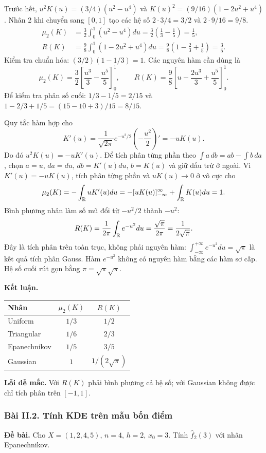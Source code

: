 Trước hết,
$u^2K(u)=(3/4)(u^2-u^4)$ và
$K(u)^2=(9/16)(1-2u^2+u^4)$.
Nhân 2 khi chuyển sang $[0,1]$ tạo các hệ số
$2\cdot3/4=3/2$ và $2\cdot9/16=9/8$.
\begin{align*}
\mu_2(K)&=\frac32\int_0^1(u^2-u^4)du
=\frac32\left(\frac13-\frac15\right)=\frac15,\\
R(K)&=\frac98\int_0^1(1-2u^2+u^4)du
=\frac98\left(1-\frac23+\frac15\right)=\frac35.
\end{align*}
Kiểm tra chuẩn hóa: $(3/2)(1-1/3)=1$.
Các nguyên hàm cần dùng là
\[
\mu_2(K)=\frac32\left[\frac{u^3}{3}-\frac{u^5}{5}\right]_0^1,
\qquad
R(K)=\frac98\left[u-\frac{2u^3}{3}+\frac{u^5}{5}\right]_0^1.
\]
Để kiểm tra phân số cuối: $1/3-1/5=2/15$ và
$1-2/3+1/5=(15-10+3)/15=8/15$.

Quy tắc hàm hợp cho
\[
K'(u)=\frac1{\sqrt{2\pi}}e^{-u^2/2}\left(-\frac{u^2}{2}\right)'
=-uK(u).
\]
Do đó $u^2K(u)=-uK'(u)$.
Để tích phân từng phần theo $\int a\,db=ab-\int b\,da$,
chọn $a=u$, $da=du$, $db=K'(u)du$, $b=K(u)$ và giữ dấu trừ ở ngoài.
Vì $K'(u)=-uK(u)$, tích phân từng phần và $uK(u)\to0$ ở vô cực cho
\[
\mu_2(K)=-\int_{\mathbb R}uK'(u)du
=-[uK(u)]_{-\infty}^{\infty}+\int_{\mathbb R}K(u)du=1.
\]
Bình phương nhân làm số mũ đổi từ $-u^2/2$ thành $-u^2$:
\[
R(K)=\frac1{2\pi}\int_{\mathbb R}e^{-u^2}du
=\frac{\sqrt\pi}{2\pi}=\frac1{2\sqrt\pi}.
\]
Đây là tích phân trên toàn trục, không phải nguyên hàm:
$\int_{-\infty}^{+\infty}e^{-u^2}du=\sqrt\pi$ là kết quả tích phân Gauss.
Hàm $e^{-u^2}$ không có nguyên hàm bằng các hàm sơ cấp.
Hệ số cuối rút gọn bằng $\pi=\sqrt\pi\sqrt\pi$.

\textbf{Kết luận.}
\begin{center}
\begin{tabular}{lcc}
\toprule Nhân & $\mu_2(K)$ & $R(K)$\\\midrule
Uniform & $1/3$ & $1/2$\\
Triangular & $1/6$ & $2/3$\\
Epanechnikov & $1/5$ & $3/5$\\
Gaussian & $1$ & $1/(2\sqrt\pi)$\\\bottomrule
\end{tabular}
\end{center}
\textbf{Lỗi dễ mắc.} Với $R(K)$ phải bình phương cả hệ số;
với Gaussian không được chỉ tích phân trên $[-1,1]$.

\subsubsection*{Bài II.2. Tính KDE trên mẫu bốn điểm}\label{ot45:calculation}
\textbf{Đề bài.} Cho $X=(1,2,4,5)$, $n=4$, $h=2$, $x_0=3$.
Tính $\widehat f_2(3)$ với nhân Epanechnikov.

